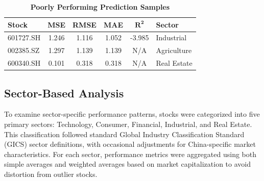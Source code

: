 \documentclass[3p,times,procedia]{elsarticle}
\begin{document}


\begin{table}[!ht]
\renewcommand{\arraystretch}{1.5} %
\centering
\large %
\caption{\textbf{Poorly Performing Prediction Samples}}
\begin{tabular}{|l|c|c|c|c|l|}
\hline
\textbf{Stock} & \textbf{MSE} & \textbf{RMSE} & \textbf{MAE} & \textbf{$\mathbf{R^2}$} & \textbf{Sector} \\
\hline
601727.SH & 1.246 & 1.116 & 1.052 & -3.985 & Industrial \\
002385.SZ & 1.297 & 1.139 & 1.139 & N/A    & Agriculture \\
600340.SH & 0.101 & 0.318 & 0.318 & N/A    & Real Estate \\
\hline
\end{tabular}
\end{table}


\subsection{Sector-Based Analysis}
To examine sector-specific performance patterns, stocks were categorized into five primary sectors: Technology, Consumer, Financial, Industrial, and Real Estate. This classification followed standard Global Industry Classification Standard (GICS) sector definitions, with occasional adjustments for China-specific market characteristics. For each sector, performance metrics were aggregated using both simple averages and weighted averages based on market capitalization to avoid distortion from outlier stocks.
\end{document}
